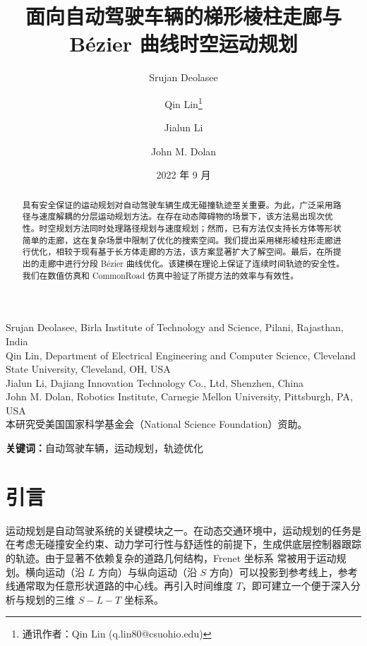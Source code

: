 \documentclass[UTF8,a4paper,12pt,fontset=none]{ctexart}
\title{面向自动驾驶车辆的梯形棱柱走廊与 B\'{e}zier 曲线时空运动规划}
\author{Srujan Deolasee \and Qin Lin\thanks{通讯作者：Qin Lin (q.lin80@csuohio.edu)} \and Jialun Li \and John M. Dolan}
\date{2022 年 9 月}
\theoremstyle{definition}
\theoremstyle{plain}
\theoremstyle{plain}
\theoremstyle{plain}
\begin{document}
\maketitle

\begin{center}
\vspace{-1em}
\footnotesize
Srujan Deolasee, Birla Institute of Technology and Science, Pilani, Rajasthan, India \\
Qin Lin, Department of Electrical Engineering and Computer Science, Cleveland State University, Cleveland, OH, USA \\
Jialun Li, Dajiang Innovation Technology Co., Ltd, Shenzhen, China \\
John M. Dolan, Robotics Institute, Carnegie Mellon University, Pittsburgh, PA, USA \\[0.3em]
本研究受美国国家科学基金会（National Science Foundation）资助。
\end{center}


\begin{abstract}

具有安全保证的运动规划对自动驾驶车辆生成无碰撞轨迹至关重要。为此，广泛采用路径与速度解耦的分层运动规划方法。在存在动态障碍物的场景下，该方法易出现次优性。时空规划方法同时处理路径规划与速度规划；然而，已有方法仅支持长方体等形状简单的走廊，这在复杂场景中限制了优化的搜索空间。我们提出采用梯形棱柱形走廊进行优化，相较于现有基于长方体走廊的方法，该方案显著扩大了解空间。最后，在所提出的走廊中进行分段 B\'{e}zier 曲线优化。该建模在理论上保证了连续时间轨迹的安全性。我们在数值仿真和 CommonRoad 仿真中验证了所提方法的效率与有效性。

\end{abstract}

\noindent\textbf{关键词：}自动驾驶车辆，运动规划，轨迹优化

\section{引言}


运动规划是自动驾驶系统的关键模块之一。在动态交通环境中，运动规划的任务是在考虑无碰撞安全约束、动力学可行性与舒适性的前提下，生成供底层控制器跟踪的轨迹。由于显著不依赖复杂的道路几何结构，Frenet 坐标系 \cite{werling_optimal_2012} 常被用于运动规划。横向运动（沿 $L$ 方向）与纵向运动（沿 $S$ 方向）可以投影到参考线上，参考线通常取为任意形状道路的中心线。再引入时间维度 $T$，即可建立一个便于深入分析与规划的三维 $S − L − T$ 坐标系。
\end{document}
